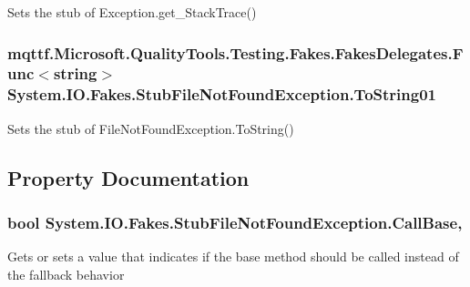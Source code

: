 Sets the stub of Exception.\-get\-\_\-\-Stack\-Trace()

\hypertarget{class_system_1_1_i_o_1_1_fakes_1_1_stub_file_not_found_exception_a8882449a9ea07890ba2343fa4304ebff}{
\subsubsection[{To\-String01}]{\setlength{\rightskip}{0pt plus 5cm}mqttf.\-Microsoft.\-Quality\-Tools.\-Testing.\-Fakes.\-Fakes\-Delegates.\-Func$<$string$>$ System.\-I\-O.\-Fakes.\-Stub\-File\-Not\-Found\-Exception.\-To\-String01}}\label{class_system_1_1_i_o_1_1_fakes_1_1_stub_file_not_found_exception_a8882449a9ea07890ba2343fa4304ebff}


Sets the stub of File\-Not\-Found\-Exception.\-To\-String()



\subsection{Property Documentation}
\hypertarget{class_system_1_1_i_o_1_1_fakes_1_1_stub_file_not_found_exception_aad5acb5534d531aa607262e76185ce19}{
\subsubsection[{Call\-Base}]{\setlength{\rightskip}{0pt plus 5cm}bool System.\-I\-O.\-Fakes.\-Stub\-File\-Not\-Found\-Exception.\-Call\-Base\hspace{0.3cm}{\ttfamily [get]}, {\ttfamily [set]}}}\label{class_system_1_1_i_o_1_1_fakes_1_1_stub_file_not_found_exception_aad5acb5534d531aa607262e76185ce19}


Gets or sets a value that indicates if the base method should be called instead of the fallback behavior

